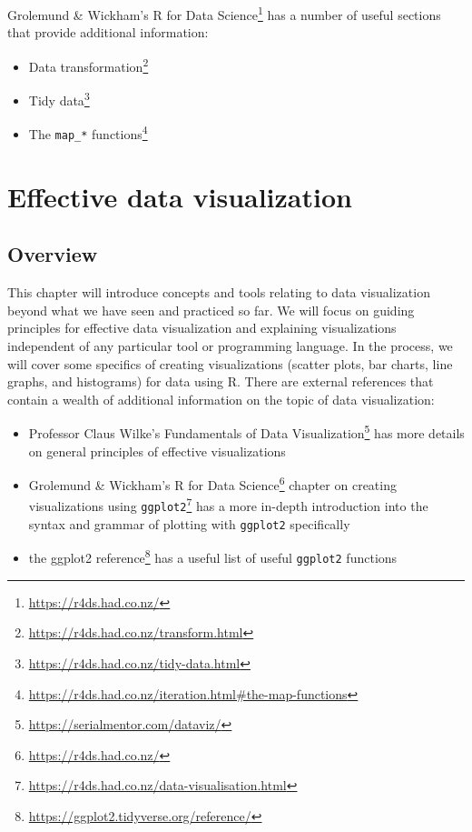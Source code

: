 \documentclass[
]{krantz}
\providecommand{\tightlist}{%
  \setlength{\itemsep}{0pt}\setlength{\parskip}{0pt}}
\renewcommand{\href}[2]{#2\footnote{\url{#1}}}
\begin{document}
Grolemund \& Wickham's \href{https://r4ds.had.co.nz/}{R for Data Science} has a number of useful sections that provide additional information:

\begin{itemize}
\tightlist
\item
  \href{https://r4ds.had.co.nz/transform.html}{Data transformation}
\item
  \href{https://r4ds.had.co.nz/tidy-data.html}{Tidy data}
\item
  \href{https://r4ds.had.co.nz/iteration.html\#the-map-functions}{The \texttt{map\_*} functions}
\end{itemize}

\hypertarget{viz}{%
\chapter{Effective data visualization}\label{viz}}

\hypertarget{overview-2}{%
\section{Overview}\label{overview-2}}

This chapter will introduce concepts and tools relating to data visualization beyond what we have seen and practiced so far.
We will focus on guiding principles for effective data visualization and explaining visualizations independent of any particular tool or programming language.
In the process, we will cover some specifics of creating visualizations (scatter plots, bar charts, line graphs, and histograms) for data using R. There
are external references that contain a wealth of additional information on the topic of data visualization:

\begin{itemize}
\tightlist
\item
  Professor Claus Wilke's \href{https://serialmentor.com/dataviz/}{Fundamentals of Data Visualization} has more details on general principles of effective visualizations
\item
  Grolemund \& Wickham's \href{https://r4ds.had.co.nz/}{R for Data Science} chapter on \href{https://r4ds.had.co.nz/data-visualisation.html}{creating visualizations using \texttt{ggplot2}} has
  a more in-depth introduction into the syntax and grammar of plotting with \texttt{ggplot2} specifically
\item
  the \href{https://ggplot2.tidyverse.org/reference/}{ggplot2 reference} has a useful list of useful \texttt{ggplot2} functions
\end{itemize}
\end{document}
